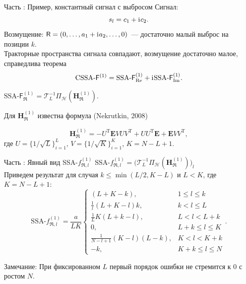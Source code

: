 \documentclass[10pt, ucs, notheorems, handout]{beamer}
\newcommand{\tX}[1]{\mathsf{#1}}
\newcommand{\iu}{\mathrm{i}\mkern1mu}
\newcommand{\RomanNumeralCaps}[1]
{\MakeUppercase{\romannumeral #1}}
\begin{document}
\begin{frame}{Часть \RomanNumeralCaps{2}: Пример, константный сигнал с выбросом}
\alert{Сигнал:}
$$s_l = c_1 + \iu c_2.$$
\alert{Возмущение:} $\tX{R} = (0, \ldots, a_1 + \iu a_2, \ldots, 0)$~--- достаточно малый выброс на позиции $k$.\\
\vspace{1em}
Тракторные пространства сигнала совпадают, возмущение достаточно малое, справедлива теорема $$\text{CSSA-}\tX{F}^{(1)} = \text{SSA-}\tX{F}^{(1)}_{\Re} + \iu\text{SSA-}\tX{F}^{(1)}_{\Im}.$$

$\text{SSA-}\tX{F}^{(1)}_{\Re} = \mathcal{T}_L^{-1} \Pi_{\mathcal{H}}(\mathbf{H}^{(1)}_{\Re})$.

Для $\mathbf{H}^{(1)}_{\Re}$ известна формула (Nekrutkin, 2008)

$$\mathbf{H}^{(1)}_{\Re} = -U^{\mathrm{T}} \mathbf{E} V U V^{\mathrm{T}} + U U^{\mathrm{T}} \mathbf{E} + \mathbf{E} V V^{\mathrm{T}},$$
где $U = \{1/\sqrt{L}\}^{L}_{i = 1},\, V = \{1/\sqrt{K}\}^{K}_{i = 1}$, $K = N - L + 1$.
\end{frame}

\begin{frame}{Часть \RomanNumeralCaps{2}: Явный вид SSA-$f^{(1)}_{\Re,l}$}
$\text{SSA-}f^{(1)}_{\Re, l} = \big( \mathcal{T}_L^{-1} \Pi_{\mathcal{H}}(\mathbf{H}^{(1)}_{\Re})\big)_{l}$\\
\vspace{1em}
    Приведем результат для случая $k \leq \min(L/2, K - L)$ и $L < K$, где $K=N-L+1$:
$$\text{SSA-}f^{(1)}_{\Re, l} = \frac{a}{{LK}}
\begin{cases}
	(L + K - k), & \text{$1 \leq l \leq k$}\\
	\frac{1}{l}(L + K - l)k, & \text{$k < l \leq L$}\\
	\frac{1}{L}K(L + k - l), &\text{$L < l < L + k$}\\
	0, &\text{$L + k \leq l \leq K$}\\
	\frac{1}{N - l + 1}(K - l)(L - k), &\text{$K < l < K + k$}\\
	-k, &\text{$K + k \leq l \leq N $}
\end{cases}.$$

\alert{Замечание:} При фиксированном $L$ первый порядок ошибки не стремится к $0$ с ростом $N$.
\end{frame}
\end{document}
